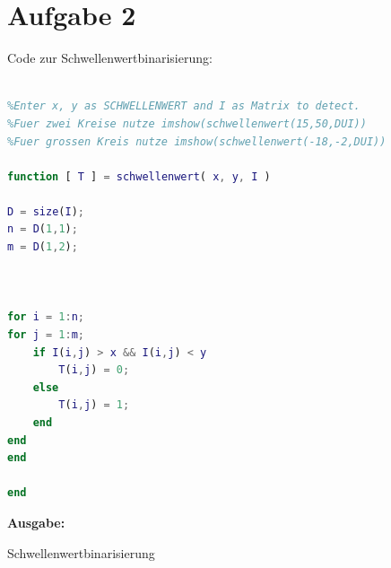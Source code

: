\documentclass[12pt,a4paper,oneside]{article}
\begin{document}
\newpage






\begin{figure} 
\section*{Aufgabe 2}
Code zur Schwellenwertbinarisierung:
\begin{lstlisting}[language=Matlab,frame=single]

%Enter x, y as SCHWELLENWERT and I as Matrix to detect.
%Fuer zwei Kreise nutze imshow(schwellenwert(15,50,DUI))
%Fuer grossen Kreis nutze imshow(schwellenwert(-18,-2,DUI))

function [ T ] = schwellenwert( x, y, I )

D = size(I);
n = D(1,1);
m = D(1,2);



for i = 1:n;
for j = 1:m;
    if I(i,j) > x && I(i,j) < y
        T(i,j) = 0;
    else
        T(i,j) = 1;
    end
end
end

end

\end{lstlisting}

\textbf{Ausgabe:\\}
\caption{Schwellenwertbinarisierung} 
\end{figure} 
\end{document}

